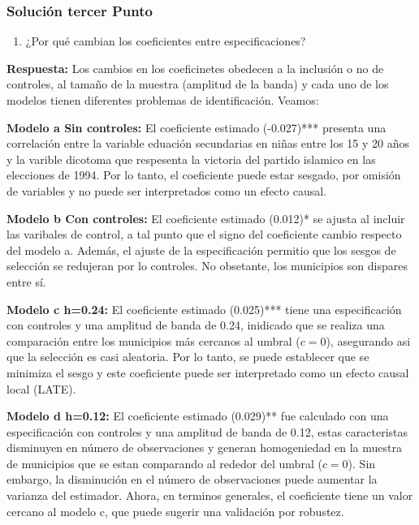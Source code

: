 \documentclass[
]{article}
\providecommand{\tightlist}{%
  \setlength{\itemsep}{0pt}\setlength{\parskip}{0pt}}
\begin{document}
\subsubsection{Solución tercer Punto}\label{soluciuxf3n-tercer-punto}

\begin{enumerate}
\def\labelenumi{\alph{enumi})}
\tightlist
\item
  ¿Por qué cambian los coeficientes entre especificaciones?
\end{enumerate}

\textbf{Respuesta:} Los cambios en los coeficinetes obedecen a la
inclusión o no de controles, al tamaño de la muestra (amplitud de la
banda) y cada uno de los modelos tienen diferentes problemas de
identificación. Veamos:

\textbf{Modelo a Sin controles:} El coeficiente estimado (-0.027)***
presenta una correlación entre la variable eduación secundarias en niñas
entre los 15 y 20 años y la varible dicotoma que respesenta la victoria
del partido islamico en las elecciones de 1994. Por lo tanto, el
coeficiente puede estar sesgado, por omisión de variables y no puede ser
interpretados como un efecto causal.

\textbf{Modelo b Con controles:} El coeficiente estimado (0.012)* se
ajusta al incluir las varibales de control, a tal punto que el signo del
coeficiente cambio respecto del modelo a. Además, el ajuste de la
especificación permitio que los sesgos de selección se redujeran por lo
controles. No obsetante, los municipios son dispares entre sí.

\textbf{Modelo c h=0.24:} El coeficiente estimado (0.025)*** tiene una
especificación con controles y una amplitud de banda de 0.24, inidicado
que se realiza una comparación entre los municipios más cercanos al
umbral (\(c=0\)), asegurando asi que la selección es casi aleatoria. Por
lo tanto, se puede establecer que se minimiza el sesgo y este
coeficiente puede ser interpretado como un efecto causal local (LATE).

\textbf{Modelo d h=0.12:} El coeficiente estimado (0.029)** fue
calculado con una especificación con controles y una amplitud de banda
de 0.12, estas caracteristas disminuyen en número de observaciones y
generan homogeniedad en la muestra de municipios que se estan comparando
al rededor del umbral (\(c=0\)). Sin embargo, la disminución en el
número de observaciones puede aumentar la varianza del estimador. Ahora,
en terminos generales, el coeficiente tiene un valor cercano al modelo
c, que puede sugerir una validación por robustez.
\end{document}
